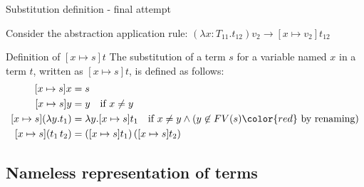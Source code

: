 \documentclass[8pt]{beamer}
\begin{document}
\begin{frame}{Substitution definition - final attempt}

    Consider the abstraction application rule:
        $(\lambda x:T_{11}.t_{12})v_{2} \rightarrow [x \mapsto v_{2}]t_{12}$

    \begin{block}{Definition of $[x \mapsto s]t$}
        The substitution of a term $s$ for a variable named $x$ in a term $t$,
        written as $[x \mapsto s]t$, is defined as follows:
        \begin{displaymath}
            \begin{split}
                [x \mapsto s]x &= s \\
                [x \mapsto s]y &= y \quad \text{if } x \not = y\\
                [x \mapsto s](\lambda y.t_{1}) &= \lambda y. [x \mapsto s]t_{1} 
                                    \quad \text{if } x \not = y 
                                    \wedge (y \not \in FV(s) 
                                    {\color{red} \text{ by renaming}})\\
                [x \mapsto s](t_{1} \, t_{2}) &= 
                    ([x \mapsto s]t_{1})\, ([x \mapsto s]t_{2})\\
            \end{split}
        \end{displaymath}        
    \end{block}
\end{frame}

\subsection{Nameless representation of terms}
\end{document}
